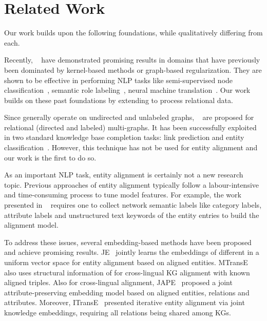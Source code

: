 
	
	\section{Related Work}
    Our work builds upon the following foundations, while qualitatively differing from each.


	 Recently, \GCNs~\cite{Duvenaud2015Convolutional,Kearnes2016Molecular}
    have demonstrated promising results in domains that have previously been dominated by kernel-based methods or graph-based regularization.
    They are shown to be effective in performing NLP tasks like semi-supervised
    node classification~\cite{Kipf2016Semi}, semantic role labeling~\cite{Marcheggiani2017Encoding}, neural machine
    translation~\cite{Bastings2017Graph}. Our work builds on these past foundations by extending \GCNs to process relational data.


	Since \GCNs generally operate on undirected and unlabeled graphs, \RGCNs~\cite{Schlichtkrull2017Modeling} are proposed  for relational
(directed and labeled) multi-graphs. It has been successfully exploited in two standard knowledge base completion tasks: link prediction
and entity classification~\cite{Schlichtkrull2017Modeling}. However, this technique has not be used for entity alignment and our work is
the first to do so.


	
	 As an important NLP task, entity alignment is certainly not a new research topic. Previous approaches of
entity alignment typically follow a labour-intensive and time-consuming process to tune model features. For example, the work presented in
~\cite{Wang2017} requires one to collect network semantic labels like category labels, attribute labels and unstructured
text keywords of the entity entries to build the alignment model.
	
	
	To address these issues, several embedding-based methods have been proposed and achieve promising results. JE~\cite{hao2016joint} jointly learns the embeddings of different \KGs in a uniform vector space for entity alignment based on aligned entities. MTransE~\cite{chen2016multilingual} also uses structural information of \KGs for cross-lingual KG alignment with known aligned triples. Also for cross-lingual \KG alignment, JAPE~\cite{sun2017cross} proposed a joint attribute-preserving embedding model based on aligned entities, relations and attributes. Moreover, ITransE~\cite{zhu2017iterative} presented iterative entity alignment via joint knowledge embeddings, requiring all relations being shared among KGs.
	
